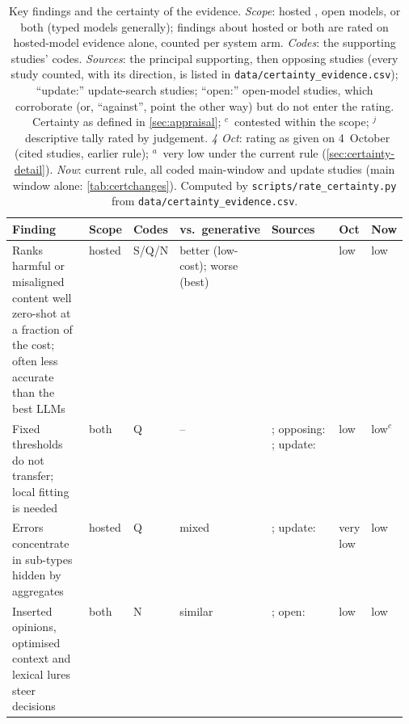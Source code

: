 \begin{table}[!htbp]
\centering
\footnotesize
\setlength{\tabcolsep}{3pt}
\caption{Key findings and the certainty of the evidence. \emph{Scope}: hosted \jev{}, open models, or both (typed models generally); findings about hosted \jev{} or both are rated on hosted-model evidence alone, counted per system arm. \emph{Codes}: the supporting studies' codes. \emph{Sources}: the principal supporting, then opposing studies (every study counted, with its direction, is listed in \nolinkurl{data/certainty_evidence.csv}); ``update:'' update-search studies; ``open:'' open-model studies, which corroborate (or, ``against'', point the other way) but do not enter the rating. Certainty as defined in \cref{sec:appraisal}; $^{c}$~contested within the scope; $^{j}$~descriptive tally rated by judgement. \emph{4 Oct}: rating as given on 4~October (cited studies, earlier rule); $^{a}$~very low under the current rule (\cref{sec:certainty-detail}). \emph{Now}: current rule, all coded main-window and update studies (main window alone: \cref{tab:certchanges}). Computed by \nolinkurl{scripts/rate_certainty.py} from \nolinkurl{data/certainty_evidence.csv}.}
\label{tab:keyfindings}
\begin{tabularx}{\linewidth}{@{}L>{\raggedright\arraybackslash}p{0.06\linewidth}>{\raggedright\arraybackslash}p{0.055\linewidth}>{\raggedright\arraybackslash}p{0.12\linewidth}>{\raggedright\arraybackslash}p{0.17\linewidth}>{\raggedright\arraybackslash}p{0.08\linewidth}>{\raggedright\arraybackslash}p{0.08\linewidth}@{}}
\toprule
Finding & Scope & Codes & vs.\ generative & Sources & 4 Oct & Now \\
\midrule
Ranks harmful or misaligned content well zero-shot at a fraction of the cost; often less accurate than the best LLMs & hosted & S/Q/N & better (low-cost); worse (best) & \cite{arx29429,jkf87_2026replication,zen22885291,arx33401,arx24574,arx27678} & low & low \\
Fixed thresholds do not transfer; local fitting is needed & both & Q & -- & \cite{arx29429,jkf87_2026replication,arx00346,arx01006,arx26550,arx24574,arx02046}; opposing: \cite{arx33689}; update: \cite{arx03387,arx02267,zen22935043} & low & low$^{c}$ \\
Errors concentrate in sub-types hidden by aggregates & hosted & Q & mixed & \cite{arx33401,alphaRAG,arx02046}; update: \cite{arx07953,arx03324,arx08675,arx10321} & very low & low \\
Inserted opinions, optimised context and lexical lures steer decisions & both & N & similar & \cite{arx31142,arx01834,arx01006,arx30243,arx02048}; open: \cite{zen22959854,zen23038928} & low & low \\

\end{tabularx}
\end{table}
